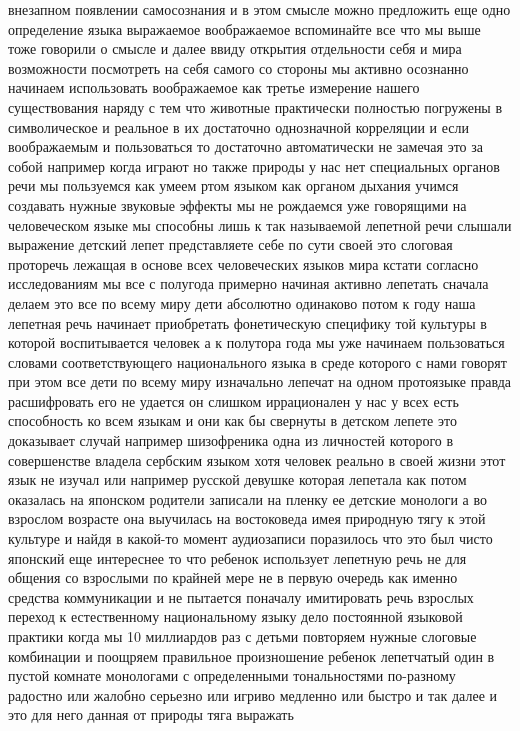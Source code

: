 внезапном появлении самосознания и в этом смысле можно предложить еще одно
определение языка выражаемое воображаемое вспоминайте все что мы выше тоже
говорили о смысле и далее ввиду открытия отдельности себя и мира возможности
посмотреть на себя самого со стороны мы активно осознанно начинаем использовать
воображаемое как третье измерение нашего существования наряду с тем что животные
практически полностью погружены в символическое и реальное в их достаточно
однозначной корреляции и если воображаемым и пользоваться то достаточно
автоматически не замечая это за собой например когда играют но также природы у
нас нет специальных органов речи мы пользуемся как умеем ртом языком как органом
дыхания учимся создавать нужные звуковые эффекты мы не рождаемся уже говорящими
на человеческом языке мы способны лишь к так называемой лепетной речи слышали
выражение детский лепет представляете себе по сути своей это слоговая проторечь
лежащая в основе всех человеческих языков мира кстати согласно исследованиям мы
все с полугода примерно начиная активно лепетать сначала делаем это все по всему
миру дети абсолютно одинаково потом к году наша лепетная речь начинает
приобретать фонетическую специфику той культуры в которой воспитывается человек
а к полутора года мы уже начинаем пользоваться словами соответствующего
национального языка в среде которого с нами говорят при этом все дети по всему
миру изначально лепечат на одном протоязыке правда расшифровать его не удается
он слишком иррационален у нас у всех есть способность ко всем языкам и они как
бы свернуты в детском лепете это доказывает случай например шизофреника одна из
личностей которого в совершенстве владела сербским языком хотя человек реально в
своей жизни этот язык не изучал или например русской девушке которая лепетала
как потом оказалась на японском родители записали на пленку ее детские монологи
а во взрослом возрасте она выучилась на востоковеда имея природную тягу к этой
культуре и найдя в какой-то момент аудиозаписи поразилось что это был чисто
японский еще интереснее то что ребенок использует лепетную речь не для общения
со взрослыми по крайней мере не в первую очередь как именно средства
коммуникации и не пытается поначалу имитировать речь взрослых переход к
естественному национальному языку дело постоянной языковой практики когда мы 10
миллиардов раз с детьми повторяем нужные слоговые комбинации и поощряем
правильное произношение ребенок лепетчатый один в пустой комнате монологами с
определенными тональностями по-разному радостно или жалобно серьезно или игриво
медленно или быстро и так далее и это для него данная от природы тяга выражать
